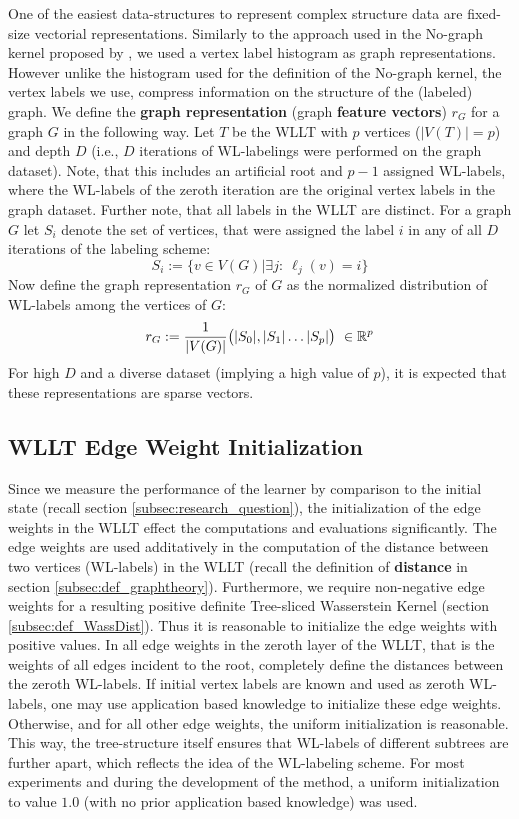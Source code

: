 	One of the easiest data-structures to represent complex structure data are fixed-size vectorial representations.
	Similarly to the approach used in the No-graph kernel proposed by \citeauthor{2021_Schulz_CONF}, we used a vertex label histogram as graph representations.
	However unlike the histogram used for the definition of the No-graph kernel, the vertex labels we use, compress information on the structure of the (labeled) graph.
	We define the \textbf{graph representation} (graph \textbf{feature vectors}) $r_G$ for a graph $G$ in the following way.
	Let $T$ be the WLLT with $p$ vertices ($|V(T)|=p$) and depth $D$ (i.e., $D$ iterations of WL-labelings were performed on the graph dataset).
	Note, that this includes an artificial root and $p-1$ assigned WL-labels, where the WL-labels of the zeroth iteration are the original vertex labels in the graph dataset.
	Further note, that all labels in the WLLT are distinct.	
	For a graph $G$ let $S_i$ denote the set of vertices, that were assigned the label $i$ in any of all $D$ iterations of the labeling scheme:
	\[ S_i := \{ v\in V(G)| \exists j:\ \ell_j(v)=i \} \]	
	Now define the graph representation $r_G$ of $G$ as the normalized distribution of WL-labels among the vertices of $G$:
	\begin{equation} \label{eq:graphrepr}
		r_G := \frac{1}{|V(G)|} \big( |S_0|, |S_1| \dots |S_p| \big)\ \in\IR^{p}
	\end{equation}
	For high $D$ and a diverse dataset (implying a high value of $p$), it is expected that these representations are sparse vectors.
	
\subsection{WLLT Edge Weight Initialization} \label{subsec:WLLT_ew_init}
	
	Since we measure the performance of the learner by comparison to the initial state (recall section \ref{subsec:research_question}), the initialization of the edge weights in the WLLT effect the computations and evaluations significantly.
	The edge weights are used additatively in the computation of the distance between two vertices (WL-labels) in the WLLT (recall the definition of \textbf{distance} in section \ref{subsec:def_graphtheory}). 
	Furthermore, we require non-negative edge weights for a resulting positive definite Tree-sliced Wasserstein Kernel (section \ref{subsec:def_WassDist}).
	Thus it is reasonable to initialize the edge weights with positive values.
	In all edge weights in the zeroth layer of the WLLT, that is the weights of all edges incident to the root, completely define the distances between the zeroth WL-labels.
	If initial vertex labels are known and used as zeroth WL-labels, one may use application based knowledge to initialize these edge weights.
	Otherwise, and for all other edge weights, the uniform initialization is reasonable.
	This way, the tree-structure itself ensures that WL-labels of different subtrees are further apart, which reflects the idea of the WL-labeling scheme.
	For most experiments and during the development of the method, a uniform initialization to value $1.0$ (with no prior application based knowledge) was used.
	
